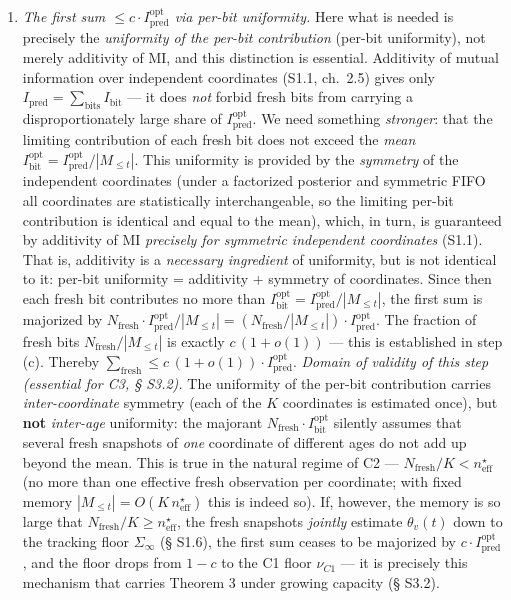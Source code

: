 \documentclass[12pt]{iopart}
\begin{document}
\begin{enumerate}

\def\labelenumi{(\alph{enumi})}

\setcounter{enumi}{1}

\item

  \emph{The first sum \(\le c\cdot I^{\text{opt}}_{\text{pred}}\) via per-bit uniformity.} Here what is needed is precisely the \emph{uniformity of the per-bit contribution} (per-bit uniformity), not merely additivity of MI, and this distinction is essential. Additivity of mutual information over independent coordinates (S1.1, \cite{CoverThomas2006} ch.~2.5) gives only \(I_{\text{pred}} = \sum_{\text{bits}} I_{\text{bit}}\) --- it does \emph{not} forbid fresh bits from carrying a disproportionately large share of \(I^{\text{opt}}_{\text{pred}}\). We need something \emph{stronger}: that the limiting contribution of each fresh bit does not exceed the \emph{mean} \(I^{\text{opt}}_{\text{bit}} = I_{\text{pred}}^{\text{opt}}/|M_{\le t}|\). This uniformity is provided by the \emph{symmetry} of the independent coordinates (under a factorized posterior and symmetric FIFO all coordinates are statistically interchangeable, so the limiting per-bit contribution is identical and equal to the mean), which, in turn, is guaranteed by additivity of MI \emph{precisely for symmetric independent coordinates} (S1.1). That is, additivity is a \emph{necessary ingredient} of uniformity, but is not identical to it: per-bit uniformity = additivity + symmetry of coordinates. Since then each fresh bit contributes no more than \(I^{\text{opt}}_{\text{bit}} = I_{\text{pred}}^{\text{opt}}/|M_{\le t}|\), the first sum is majorized by \(N_{\text{fresh}}\cdot I_{\text{pred}}^{\text{opt}}/|M_{\le t}| = (N_{\text{fresh}}/|M_{\le t}|)\cdot I_{\text{pred}}^{\text{opt}}\). The fraction of fresh bits \(N_{\text{fresh}}/|M_{\le t}|\) is exactly \(c\,(1+o(1))\) --- this is established in step (c). Thereby \(\sum_{\text{fresh}} \le c\,(1+o(1))\cdot I_{\text{pred}}^{\text{opt}}\). \emph{Domain of validity of this step (essential for C3, § S3.2).} The uniformity of the per-bit contribution carries \emph{inter-coordinate} symmetry (each of the \(K\) coordinates is estimated once), but \textbf{not} \emph{inter-age} uniformity: the majorant \(N_{\text{fresh}}\cdot I^{\text{opt}}_{\text{bit}}\) silently assumes that several fresh snapshots of \emph{one} coordinate of different ages do not add up beyond the mean. This is true in the natural regime of C2 --- \(N_{\text{fresh}}/K < n_{\text{eff}}^\star\) (no more than one effective fresh observation per coordinate; with fixed memory \(|M_{\le t}| = O(K\,n_{\text{eff}}^\star)\) this is indeed so). If, however, the memory is so large that \(N_{\text{fresh}}/K \ge n_{\text{eff}}^\star\), the fresh snapshots \emph{jointly} estimate \(\theta_v(t)\) down to the tracking floor \(\Sigma_\infty\) (§ S1.6), the first sum ceases to be majorized by \(c\cdot I_{\text{pred}}^{\text{opt}}\), and the floor drops from \(1-c\) to the C1 floor \(\nu_{C1}\) --- it is precisely this mechanism that carries Theorem 3 under growing capacity (§ S3.2).


\end{enumerate}
\end{document}
